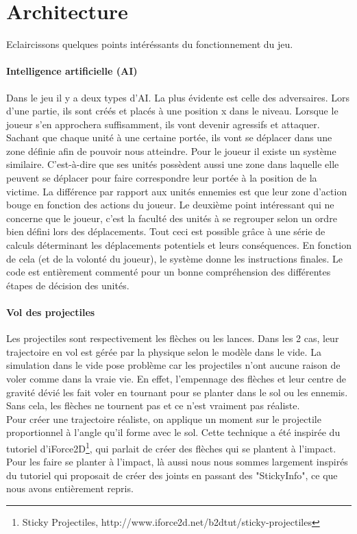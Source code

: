 \documentclass[a4paper,10pt]{article}
\begin{document}
  \pagebreak 
  \section{Architecture}
  Eclaircissons quelques points intéréssants du fonctionnement du jeu.
  \paragraph{Intelligence artificielle (AI)}
  Dans le jeu il y a deux types d'AI. La plus évidente est celle des adversaires. Lors d'une partie, ils sont créés et placés à une position x dans le niveau. Lorsque le joueur s'en approchera suffisamment, ils vont devenir agressifs et attaquer. Sachant que chaque unité à une certaine portée, ils vont se déplacer dans une zone définie afin de pouvoir nous atteindre.
  \newline Pour le joueur il existe un système similaire. C'est-à-dire que ses unités possèdent aussi une zone dans laquelle elle peuvent se déplacer pour faire correspondre leur portée à la position de la victime. La différence par rapport aux unités ennemies est que leur zone d'action bouge en fonction des actions du joueur.
  \newline Le deuxième point intéressant qui ne concerne que le joueur, c'est la faculté des unités à se regrouper selon un ordre bien défini lors des déplacements.
  \newline Tout ceci est possible grâce à une série de calculs déterminant les déplacements potentiels et leurs conséquences. En fonction de cela (et de la volonté du joueur), le système donne les instructions finales. Le code est entièrement commenté pour un bonne compréhension des différentes étapes de décision des unités.
   
    \paragraph{Vol des projectiles}
  Les projectiles sont respectivement les flèches ou les lances. Dans les 2 cas, leur trajectoire en vol est gérée par la physique selon le modèle dans le vide. La simulation dans le vide pose problème car les projectiles n'ont aucune raison de voler comme dans la vraie vie. En effet, l'empennage des flèches et leur centre de gravité dévié les fait voler en tournant pour se planter dans le sol ou les ennemis. Sans cela, les flèches ne tournent pas et ce n'est vraiment pas réaliste.\\
  Pour créer une trajectoire réaliste, on applique un moment sur le projectile proportionnel à l'angle qu'il forme avec le sol. Cette technique a été inspirée du tutoriel d'iForce2D\footnote{Sticky Projectiles, http://www.iforce2d.net/b2dtut/sticky-projectiles}, qui parlait de créer des flèches qui se plantent à l'impact. \\
  Pour les faire se planter à l'impact, là aussi nous nous sommes largement inspirés du tutoriel qui proposait de créer des joints en passant des "StickyInfo", ce que nous avons entièrement repris. \\ 
  
\end{document}
